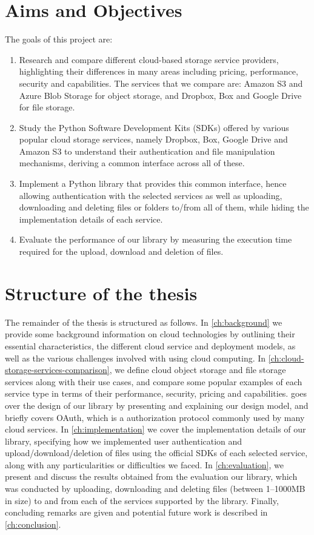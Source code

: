 \section{Aims and Objectives}
The goals of this project are:

\begin{enumerate}
    \item Research and compare different cloud-based storage service providers, highlighting their differences in many areas including pricing, performance, security and capabilities. The services that we compare are: Amazon S3 and Azure Blob Storage for object storage, and Dropbox, Box and Google Drive for file storage.

    \item Study the Python Software Development Kits (SDKs) offered by various popular cloud storage services, namely Dropbox, Box, Google Drive and Amazon S3 to understand their authentication and file manipulation mechanisms, deriving a common interface across all of these.

    \item Implement a Python library that provides this common interface, hence allowing authentication with the selected services as well as uploading, downloading and deleting files or folders to/from all of them, while hiding the implementation details of each service.

    \item Evaluate the performance of our library by measuring the execution time required for the upload, download and deletion of files.
\end{enumerate}

\section{Structure of the thesis}
The remainder of the thesis is structured as follows. In \autoref{ch:background} we provide some background information on cloud technologies by outlining their essential characteristics, the different cloud service and deployment models, as well as the various challenges involved with using cloud computing. In \autoref{ch:cloud-storage-services-comparison}, we define cloud object storage and file storage services along with their use cases, and compare some popular examples of each service type in terms of their performance, security, pricing and capabilities.  goes over the design of our library by presenting and explaining our design model, and briefly covers OAuth, which is a authorization protocol commonly used by many cloud services. In \autoref{ch:implementation} we cover the implementation details of our library, specifying how we implemented user authentication and upload/download/deletion of files using the official SDKs of each selected service, along with any particularities or difficulties we faced. In \autoref{ch:evaluation}, we present and discuss the results obtained from the evaluation our library, which was conducted by uploading, downloading and deleting files (between 1--1000MB in size) to and from each of the services supported by the library. Finally, concluding remarks are given and potential future work is described in \autoref{ch:conclusion}.
